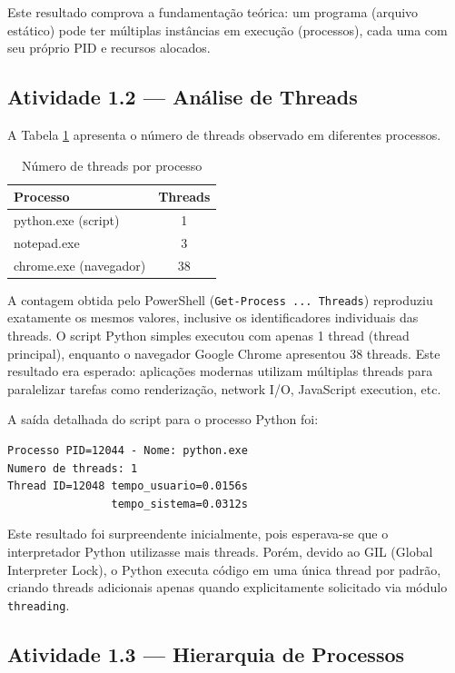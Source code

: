 \documentclass[12pt,a4paper]{article}
\begin{document}
Este resultado comprova a fundamentação teórica: um programa (arquivo estático) pode ter múltiplas instâncias em execução (processos), cada uma com seu próprio PID e recursos alocados.

\subsection{Atividade 1.2 — Análise de Threads}

A Tabela \ref{tab:threads} apresenta o número de threads observado em diferentes processos.

\begin{table}[H]
\centering
\caption{Número de threads por processo}
\label{tab:threads}
\begin{tabular}{@{}lc@{}}
\toprule
\textbf{Processo} & \textbf{Threads} \\ \midrule
python.exe (script) & 1 \\
notepad.exe & 3 \\
chrome.exe (navegador) & 38 \\ \bottomrule
\end{tabular}
\end{table}

A contagem obtida pelo PowerShell (\texttt{Get-Process ... Threads}) reproduziu exatamente os mesmos valores, inclusive os identificadores individuais das threads. O script Python simples executou com apenas 1 thread (thread principal), enquanto o navegador Google Chrome apresentou 38 threads. Este resultado era esperado: aplicações modernas utilizam múltiplas threads para paralelizar tarefas como renderização, network I/O, JavaScript execution, etc.

A saída detalhada do script para o processo Python foi:

\begin{lstlisting}[caption={Saída de threads\_do\_processo.py}]
Processo PID=12044 - Nome: python.exe
Numero de threads: 1
Thread ID=12048 tempo_usuario=0.0156s
                tempo_sistema=0.0312s
\end{lstlisting}

Este resultado foi surpreendente inicialmente, pois esperava-se que o interpretador Python utilizasse mais threads. Porém, devido ao GIL (Global Interpreter Lock), o Python executa código em uma única thread por padrão, criando threads adicionais apenas quando explicitamente solicitado via módulo \texttt{threading}.

\subsection{Atividade 1.3 — Hierarquia de Processos}
\end{document}

